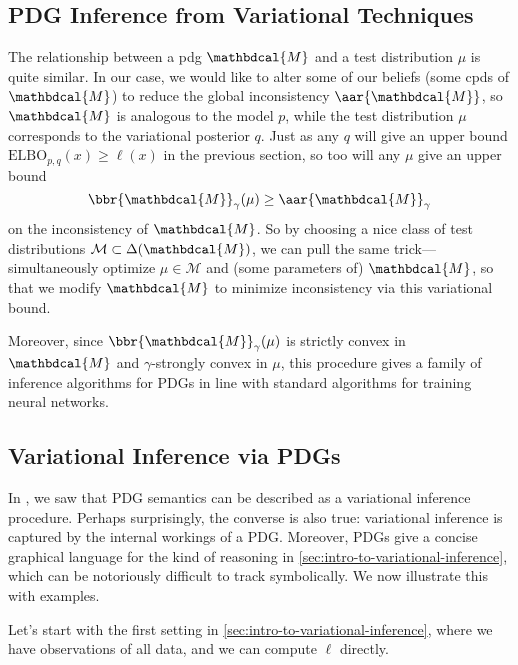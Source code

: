 \documentclass{article}
\theoremstyle{plain}
\theoremstyle{definition}
\theoremstyle{remark}
\newcommand{\dg}[1]{\mathbdcal{#1}}
\begin{document}
\subsection{PDG Inference from Variational Techniques}
	\label{sec:inference-from-variation}

The relationship between a pdg $\dg M$ and a test distribution $\mu$ is quite similar. 
In our case, we would like to alter some of our beliefs (some cpds of $\dg M$) to reduce the global inconsistency $\aar{\dg M}$, so $\dg M$ is analogous to the model $p$, while the test distribution $\mu$ corresponds to the variational posterior $q$. 
Just as any $q$ will give an upper bound $\mathrm{ELBO}_{p,q}(x) \ge \ell(x)$ in the previous section, so too will any $\mu$ give an upper bound 
\[ \bbr{\dg M}_\gamma(\mu) \ge \aar{\dg M}_\gamma \]
on the inconsistency of $\dg M$. So by choosing a nice class of test distributions $\mathcal M \subset \Delta(\dg M)$, we can pull the same trick---simultaneously optimize $\mu \in \mathcal M$ and (some parameters of) $\dg M$, so that we modify $\dg M$ to minimize inconsistency via this variational bound.

Moreover, since $\bbr{\dg M}_\gamma(\mu)$ is strictly convex in $\dg M$ and $\gamma$-strongly convex in $\mu$, this procedure gives a family of inference algorithms for PDGs in line with standard algorithms for training neural networks.

\subsection{Variational Inference via PDGs}
In , we saw that PDG semantics can be described as a variational inference procedure. 
Perhaps surprisingly, the converse is also true: variational inference is captured by the internal workings of a PDG. 
Moreover, PDGs give a concise graphical language for the kind of reasoning in \cref{sec:intro-to-variational-inference}, which can be notoriously difficult to track symbolically. We now illustrate this with examples.

Let's start with the first setting in \cref{sec:intro-to-variational-inference}, where we have observations of all data, and we can compute $\ell$ directly. 
\end{document}
